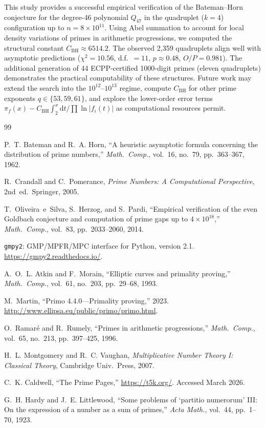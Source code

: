 \documentclass[11pt, a4paper]{article}
\begin{document}
This study provides a successful empirical verification of the Bateman--Horn conjecture for the degree-46 polynomial $Q_{47}$ in the quadruplet ($k=4$) configuration up to $n = 8 \times 10^{11}$. Using Abel summation to account for local density variations of primes in arithmetic progressions, we computed the structural constant $C_{\mathrm{BH}} \approx 6514.2$. The observed 2{,}359 quadruplets align well with asymptotic predictions ($\chi^2 = 10.56$, d.f.\ $= 11$, $p \approx 0.48$, $O/P = 0.981$). The additional generation of 44 ECPP-certified 1000-digit primes (eleven quadruplets) demonstrates the practical computability of these structures. Future work may extend the search into the $10^{12}$--$10^{13}$ regime, compute $C_{\mathrm{BH}}$ for other prime exponents $q \in \{53, 59, 61\}$, and explore the lower-order error terms $\pi_f(x) - C_{\mathrm{BH}}\!\int_2^x \mathrm{d}t/\prod\ln|f_i(t)|$ as computational resources permit.

\begin{thebibliography}{99}

P.~T. Bateman and R.~A. Horn, ``A heuristic asymptotic formula concerning the distribution of prime numbers,'' \emph{Math.\ Comp.}, vol.~16, no.~79, pp.~363--367, 1962.

R.~Crandall and C.~Pomerance, \emph{Prime Numbers: A Computational Perspective}, 2nd~ed.\ Springer, 2005.

T.~Oliveira~e~Silva, S.~Herzog, and S.~Pardi, ``Empirical verification of the even Goldbach conjecture and computation of prime gaps up to $4 \times 10^{18}$,'' \emph{Math.\ Comp.}, vol.~83, pp.~2033--2060, 2014.

\texttt{gmpy2}: GMP/MPFR/MPC interface for Python, version 2.1. \url{https://gmpy2.readthedocs.io/}.

A.~O.~L. Atkin and F.~Morain, ``Elliptic curves and primality proving,'' \emph{Math.\ Comp.}, vol.~61, no.~203, pp.~29--68, 1993.

M.~Martin, ``Primo 4.4.0---Primality proving,'' 2023. \url{http://www.ellipsa.eu/public/primo/primo.html}.

O.~Ramar\'e and R.~Rumely, ``Primes in arithmetic progressions,'' \emph{Math.\ Comp.}, vol.~65, no.~213, pp.~397--425, 1996.

H.~L. Montgomery and R.~C. Vaughan, \emph{Multiplicative Number Theory I: Classical Theory}, Cambridge Univ.\ Press, 2007.

C.~K. Caldwell, ``The Prime Pages,'' \url{https://t5k.org/}. Accessed March 2026.

G.~H. Hardy and J.~E. Littlewood, ``Some problems of `partitio numerorum' III: On the expression of a number as a sum of primes,'' \emph{Acta Math.}, vol.~44, pp.~1--70, 1923.

\end{thebibliography}
\end{document}
